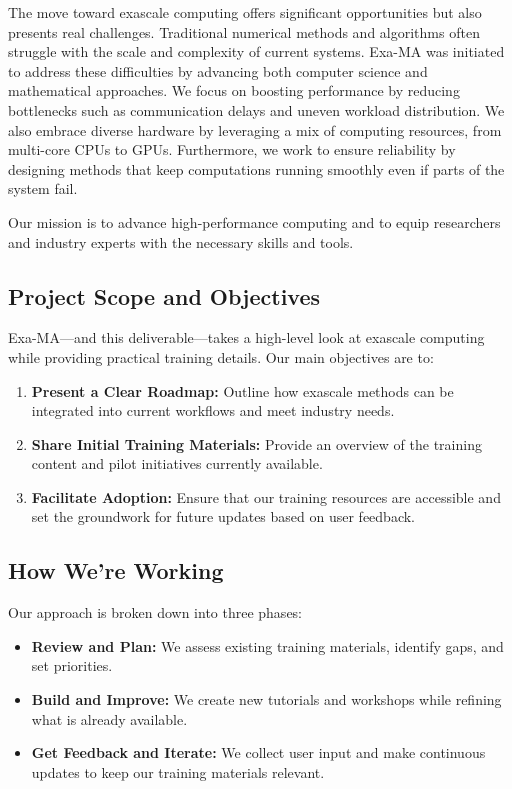 The move toward exascale computing offers significant opportunities but also presents real challenges.  
Traditional numerical methods and algorithms often struggle with the scale and complexity of current systems.  
Exa-MA was initiated to address these difficulties by advancing both computer science and mathematical approaches.  
We focus on boosting performance by reducing bottlenecks such as communication delays and uneven workload distribution.  
We also embrace diverse hardware by leveraging a mix of computing resources, from multi-core CPUs to GPUs.  
Furthermore, we work to ensure reliability by designing methods that keep computations running smoothly even if parts of the system fail.

Our mission is to advance high-performance computing and to equip researchers and industry experts with the necessary skills and tools.

\subsection{Project Scope and Objectives}

Exa-MA—and this deliverable—takes a high-level look at exascale computing while providing practical training details. Our main objectives are to:
\begin{enumerate}
    \item \textbf{Present a Clear Roadmap:} Outline how exascale methods can be integrated into current workflows and meet industry needs.
    \item \textbf{Share Initial Training Materials:} Provide an overview of the training content and pilot initiatives currently available.
    \item \textbf{Facilitate Adoption:} Ensure that our training resources are accessible and set the groundwork for future updates based on user feedback.
\end{enumerate}

\subsection{How We're Working}

Our approach is broken down into three phases:
\begin{itemize}
    \item \textbf{Review and Plan:} We assess existing training materials, identify gaps, and set priorities.
    \item \textbf{Build and Improve:} We create new tutorials and workshops while refining what is already available.
    \item \textbf{Get Feedback and Iterate:} We collect user input and make continuous updates to keep our training materials relevant.
\end{itemize}

